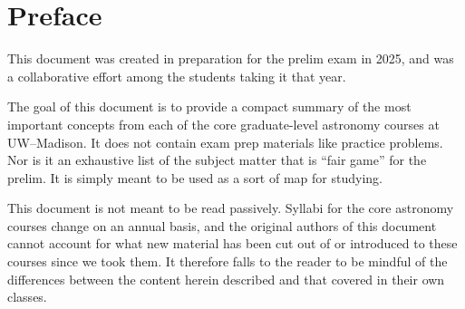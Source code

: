 \chapter*{Preface}

This document was created in preparation for the prelim exam in 2025, and was a collaborative effort among the students taking it that year.

The goal of this document is to provide a compact summary of the most important concepts from each of the core graduate-level astronomy courses at UW--Madison. It does not contain exam prep materials like practice problems. Nor is it an exhaustive list of the subject matter that is ``fair game'' for the prelim. It is simply meant to be used as a sort of map for studying.

This document is not meant to be read passively. Syllabi for the core astronomy courses change on an annual basis, and the original authors of this document cannot account for what new material has been cut out of or introduced to these courses since we took them. It therefore falls to the reader to be mindful of the differences between the content herein described and that covered in their own classes.